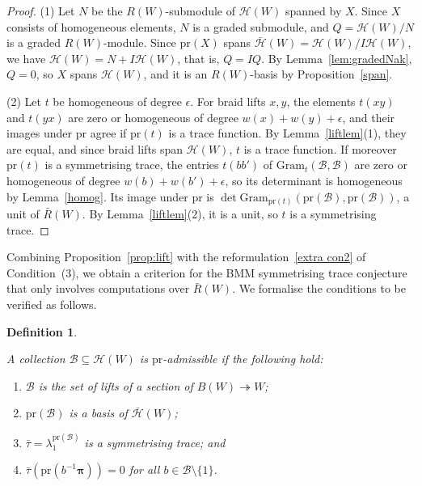 \documentclass[11pt, reqno]{amsart}
\numberwithin{equation}{section}
\newtheorem{definition}[theorem]{Definition}
\theoremstyle{remark}
\begin{document}
\begin{proof}
(1) Let $N$ be the $R(W)$-submodule of $\mathcal H(W)$ spanned by $X$.
Since $X$ consists of homogeneous elements, $N$ is a graded submodule,
and $Q=\mathcal H(W)/N$ is a graded $R(W)$-module. Since
$\mathrm{pr}(X)$ spans $\bar{\mathcal H}(W)=\mathcal H(W)/I\mathcal H(W)$,
we have $\mathcal H(W)=N+I\mathcal H(W)$, that is, $Q=IQ$. By
Lemma~\ref{lem:gradedNak}, $Q=0$, so $X$ spans $\mathcal H(W)$, and it
is an $R(W)$-basis by Proposition~\ref{span}.

(2) Let $t$ be homogeneous of degree $\epsilon$. For braid lifts
$x,y$, the elements $t(xy)$ and $t(yx)$ are zero or
homogeneous of degree $w(x)+w(y)+\epsilon$, and their images under
$\mathrm{pr}$ agree if $\mathrm{pr}(t)$ is a trace function. By
Lemma~\ref{liftlem}(1), they are equal, and since braid lifts span
$\mathcal H(W)$, $t$ is a trace function. If moreover
$\mathrm{pr}(t)$ is a symmetrising trace, the entries
$t(bb')$ of $\mathrm{Gram}_t(\mathcal B,\mathcal B)$ are zero
or homogeneous of degree $w(b)+w(b')+\epsilon$, so its determinant is
homogeneous by Lemma~\ref{homog}. Its image under $\mathrm{pr}$ is
$\det\mathrm{Gram}_{\mathrm{pr}(t)}(\mathrm{pr}(\mathcal B),
\mathrm{pr}(\mathcal B))$, a unit of $\bar R(W)$. By
Lemma~\ref{liftlem}(2), it is a unit, so $t$ is a symmetrising
trace.
\end{proof}


Combining Proposition~\ref{prop:lift} with the reformulation~\eqref{extra con2} of
Condition~(3), we obtain a criterion for the BMM symmetrising trace
conjecture that only involves computations over $\bar R(W)$. We
formalise the conditions to be verified as follows.


\begin{definition}\label{def:pradm}{\rm
A collection $\mathcal B\subseteq\mathcal H(W)$ is
\emph{$\mathrm{pr}$-admissible} if the following hold:
\begin{enumerate}
\item $\mathcal B$ is the set of lifts of a section of
  $B(W)\twoheadrightarrow W$; \smallbreak
\item $\mathrm{pr}(\mathcal B)$ is a basis of $\bar{\mathcal H}(W)$;\smallbreak
\item $\bar\tau=\lambda_1^{\mathrm{pr}(\mathcal B)}$ is a symmetrising
  trace; and\smallbreak
\item $\bar\tau(\mathrm{pr}(b^{-1}\boldsymbol\pi))=0$ for all
  $b\in\mathcal B\setminus\{1\}$.
\end{enumerate}}
\end{definition}
\end{document}
